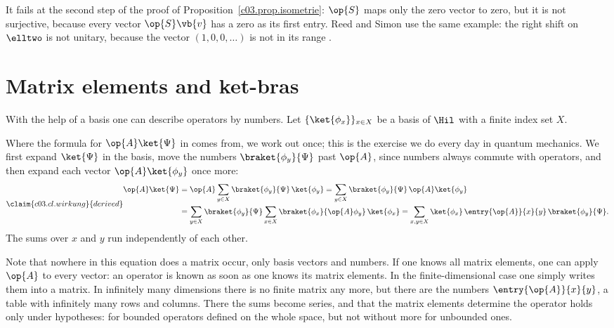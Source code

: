 \begin{vertiefung}
  It fails at the second step of the proof of Proposition~\ref{c03.prop.isometrie}: $\op{S}$
  maps only the zero vector to zero, but it is not surjective, because every vector
  $\op{S}\vb{v}$ has a zero as its first entry. Reed and Simon use the same example: the right
  shift on $\elltwo$ is not unitary, because the vector $(1, 0, 0, \dots)$ is not in its range
  .
\end{vertiefung}

\section{Matrix elements and ket-bras}\label{c03.s11}

With the help of a basis one can describe operators by numbers. Let
$\{\ket{\phi_x}\}_{x \in X}$ be a basis of $\Hil$ with a finite index set $X$.


Where the formula for $\op{A}\ket{\Psi}$ in  comes from, we work out once; this is
the exercise we do every day in quantum mechanics. We first expand $\ket{\Psi}$ in the basis,
move the numbers $\braket{\phi_y}{\Psi}$ past $\op{A}$, since numbers always commute with
operators, and then expand each vector $\op{A}\ket{\phi_y}$ once more:
\begin{equation}\label{c03.eq.wirkung}\claim{c03.cl.wirkung}{derived}
  \begin{aligned}
    \op{A}\ket{\Psi}
    &= \op{A} \sum_{y \in X} \braket{\phi_y}{\Psi}\, \ket{\phi_y}
     = \sum_{y \in X} \braket{\phi_y}{\Psi}\, \op{A}\ket{\phi_y} \\
    &= \sum_{y \in X} \braket{\phi_y}{\Psi} \sum_{x \in X} \braket{\phi_x}{\op{A}\phi_y}\, \ket{\phi_x}
     = \sum_{x, y \in X} \ket{\phi_x}\, \entry{\op{A}}{x}{y}\, \braket{\phi_y}{\Psi} .
  \end{aligned}
\end{equation}
The sums over $x$ and $y$ run independently of each other.

Note that nowhere in this equation does a matrix occur, only basis vectors and numbers. If one
knows all matrix elements, one can apply $\op{A}$ to every vector: an operator is known as soon
as one knows its matrix elements. In the finite-dimensional case one simply writes them into a
matrix. In infinitely many dimensions there is no finite matrix any more, but there are the
numbers $\entry{\op{A}}{x}{y}$, a table with infinitely many rows and columns. There the sums
become series, and that the matrix elements determine the operator holds only under
hypotheses: for bounded operators defined on the whole space, but not without more for
unbounded ones.

